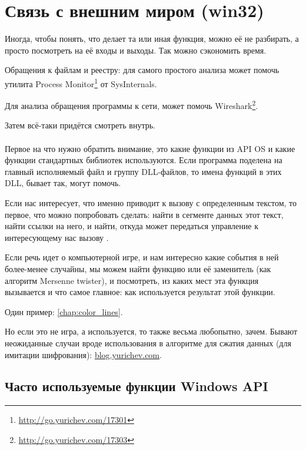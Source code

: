 \section{Связь с внешним миром (win32)}

Иногда, чтобы понять, что делает та или иная функция, можно её не разбирать, а просто посмотреть на её входы и выходы.
Так можно сэкономить время.

Обращения к файлам и реестру: 
для самого простого анализа может помочь утилита Process Monitor\footnote{\url{http://go.yurichev.com/17301}}
от SysInternals.

Для анализа обращения программы к сети, может помочь  Wireshark\footnote{\url{http://go.yurichev.com/17303}}.

Затем всё-таки придётся смотреть внутрь. \\
\\
Первое на что нужно обратить внимание, это какие функции из \ac{API} \ac{OS}
и какие функции стандартных библиотек используются.
Если программа поделена на главный исполняемый файл и группу DLL-файлов, то имена функций в этих DLL, бывает так, могут помочь.

Если нас интересует, что именно приводит к вызову  с определенным текстом, 
то первое, что можно попробовать сделать: найти в сегменте данных этот текст, найти ссылки на него, и найти, 
откуда может передаться управление к интересующему нас вызову .

Если речь идет о компьютерной игре, и нам интересно какие события в ней более-менее случайны, 
мы можем найти функцию \rand или её заменитель (как алгоритм Mersenne twister), и посмотреть, 
из каких мест эта функция вызывается и что самое главное: как используется результат этой функции.%

Один пример: \ref{chap:color_lines}. 

Но если это не игра, а \rand используется, то также весьма любопытно, зачем. 
Бывают неожиданные случаи вроде использования \rand в алгоритме для сжатия данных (для имитации шифрования):
\href{http://go.yurichev.com/17221}{blog.yurichev.com}.

\subsection{Часто используемые функции Windows API}

